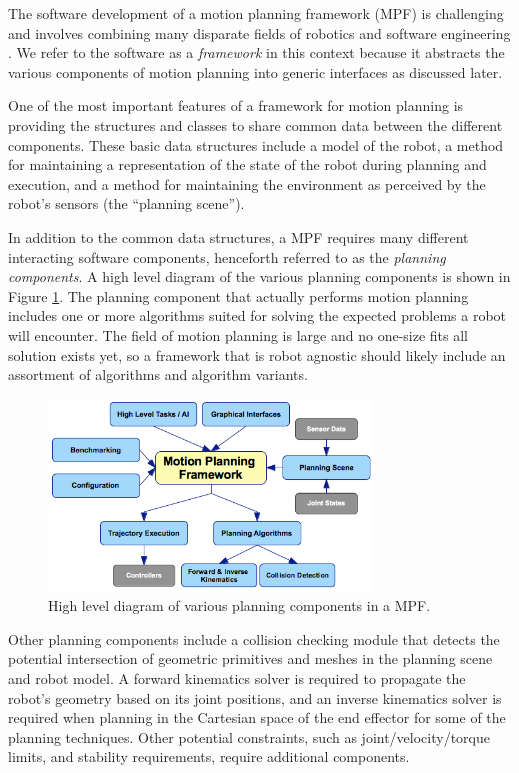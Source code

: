 \documentclass[10pt,journal,compsoc]{joser1}
\begin{document}
{The software development of a motion planning framework (MPF) is challenging and involves combining many disparate fields of robotics and software engineering \cite{perez2010roadmap}. We refer to the software as a \textit{framework} in this context because it abstracts the various components of motion planning into generic interfaces as discussed later.

One of the most important features of a framework for motion planning is providing the structures and classes to share common data between the different components. These basic data structures include a model of the robot, a method for maintaining a representation of the state of the robot during planning and execution, and a method for maintaining the environment as perceived by the robot's sensors (the ``planning scene'').

In addition to the common data structures, a MPF requires many different interacting software components, henceforth referred to as the \textit{planning components}. A high level diagram of the various planning components is shown in Figure \ref{fig:motionplanning_highlevel}. The planning component that actually performs motion planning includes one or more algorithms suited for solving the expected problems a robot will encounter. The field of motion planning is large and no one-size fits all solution exists yet, so a framework that is robot agnostic should likely include an assortment of algorithms and algorithm variants.

\begin{figure}[!t]
\centering
\includegraphics[width=3.4in]{images/motionplanning_highlevel}
\caption{High level diagram of various planning components in a MPF.}
\label{fig:motionplanning_highlevel}
\end{figure} 

Other planning components include a collision checking module that detects the potential intersection of geometric primitives and meshes in the planning scene and robot model. A forward kinematics solver is required to propagate the robot's geometry based on its joint positions, and an inverse kinematics solver is required when planning in the Cartesian space of the end effector for some of the planning techniques. Other potential constraints, such as joint/velocity/torque limits, and stability requirements, require additional components.

}
\end{document}
